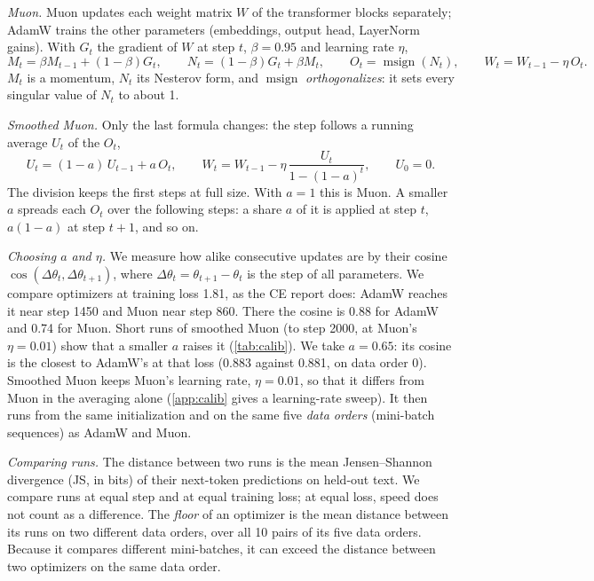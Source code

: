 \documentclass[10pt]{article}
\makeatletter
\renewcommand\paragraph{\@startsection{paragraph}{4}{\z@}{1.0ex \@plus .3ex \@minus .2ex}{-1em}{\normalfont\normalsize\bfseries}}
\makeatother
\begin{document}
\emph{Muon.} Muon \citep{jordan2024muon} updates each weight matrix $W$ of the transformer blocks separately; AdamW
trains the other parameters (embeddings, output head, LayerNorm gains). With $G_t$ the gradient of $W$ at step $t$,
$\beta=0.95$ and learning rate $\eta$,
\[
M_t=\beta M_{t-1}+(1-\beta)G_t,\qquad N_t=(1-\beta)G_t+\beta M_t,\qquad O_t=\operatorname{msign}(N_t),\qquad
W_t=W_{t-1}-\eta\,O_t .
\]
$M_t$ is a momentum, $N_t$ its Nesterov form, and $\operatorname{msign}$ \emph{orthogonalizes}: it sets every singular
value of $N_t$ to about 1.

\emph{Smoothed Muon.} Only the last formula changes: the step follows a running average $U_t$ of the $O_t$,
\[
U_t=(1-a)\,U_{t-1}+a\,O_t,\qquad W_t=W_{t-1}-\eta\,\frac{U_t}{1-(1-a)^t},\qquad U_0=0 .
\]
The division keeps the first steps at full size. With $a=1$ this is Muon. A smaller $a$ spreads each $O_t$ over the
following steps: a share $a$ of it is applied at step $t$, $a(1-a)$ at step $t+1$, and so on.

\emph{Choosing $a$ and $\eta$.} We measure how alike consecutive updates are by their cosine
$\cos(\Delta\theta_t,\Delta\theta_{t+1})$, where $\Delta\theta_t=\theta_{t+1}-\theta_t$ is the step of all parameters.
We compare optimizers at training loss 1.81, as the CE report does: AdamW reaches it near step 1450 and Muon near
step 860. There the cosine is 0.88 for AdamW and 0.74 for Muon. Short runs of smoothed Muon (to step 2000, at Muon's
$\eta=0.01$) show that a smaller $a$ raises it (\cref{tab:calib}). We take $a=0.65$: its cosine is the closest to
AdamW's at that loss (0.883 against 0.881, on data order 0). Smoothed Muon keeps Muon's learning rate, $\eta=0.01$, so that it differs
from Muon in the averaging alone (\cref{app:calib} gives a learning-rate sweep). It then runs from the same
initialization and on the same five \emph{data orders} (mini-batch sequences) as AdamW and Muon.

\begin{table}[H]
\centering\small
\caption{Choosing $a$: cosine between consecutive updates at training loss 1.81 and validation loss at step 2000,
on data order 0 with $\eta=0.01$. AdamW: its full run on data order 0, at its own $\eta=2\cdot10^{-3}$. Second row: the
cosine over the 36 weight matrices of the transformer blocks only. Bold: the chosen $a$.}
\label{tab:calib}

\end{table}

\paragraph{Step 1: how the trajectories differ (\cref{fig:div}).} \emph{Comparing runs.} The distance between two runs
is the mean Jensen--Shannon divergence (JS, in bits) of their next-token predictions on held-out text. We compare runs
at equal step and at equal training loss; at equal loss, speed does not count as a difference. The \emph{floor} of an
optimizer is the mean distance between its runs on two different data orders, over all 10 pairs of its five data
orders. Because it compares different mini-batches, it can
exceed the distance between two optimizers on the same data order.
\end{document}
